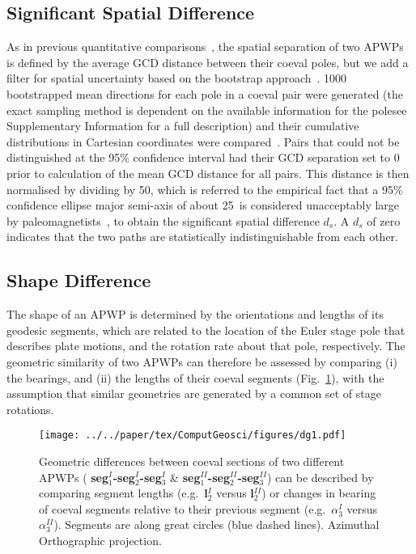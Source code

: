 \subsection{Significant Spatial Difference}\label{sec:sigDs}

As in previous quantitative comparisons~\citep[for example]{S07,T08}, the spatial
separation of two APWPs is defined by the average GCD distance between their
coeval poles, but we add a filter for spatial uncertainty based on the bootstrap
approach~\citep{T91}. 1000 bootstrapped mean directions for each pole in a
coeval pair were generated (the exact sampling method is dependent on the
available information for the pole\textemdash{}see Supplementary Information for
a full description) and their cumulative distributions in Cartesian coordinates
were compared~\citep{T91}. Pairs that could not be distinguished at the
95\% confidence interval had their GCD separation set to 0 prior to calculation
of the mean GCD distance for all pairs. This distance is then normalised by
dividing by 50\degree, which is referred to the empirical fact that a 95\%
confidence ellipse major semi-axis of about 25\degree\ is considered unacceptably
large by paleomagnetists~\citep{B92}, to obtain the significant spatial
difference $d_s$. A $d_s$ of zero indicates that the two paths are statistically
indistinguishable from each other.

\subsection{Shape Difference}

The shape of an APWP is determined by the orientations and lengths of its
geodesic segments, which are related to the location of the Euler stage pole
that describes plate motions, and the rotation rate about that pole,
respectively. The geometric similarity of two APWPs can therefore be assessed
by comparing (i) the bearings, and (ii) the lengths of their coeval segments
(Fig.~\ref{fig:direcdiff}), with the assumption that similar geometries are
generated by a common set of stage rotations.

\begin{figure}[tbp]
\texttt{[image: ../../paper/tex/ComputGeosci/figures/dg1.pdf]}
\caption[Geometric difference definition between two APWPs]{Geometric
differences between coeval sections of two different APWPs ({\bf
seg$_1^I$-seg$_2^I$-seg$_3^I$} \& {\bf seg$_1^{II}$-seg$_2^{II}$-seg$_3^{II}$})
can be described by comparing segment lengths (e.g.\ {\bf l$_2^I$} versus {\bf
l$_2^{II}$}) or changes in bearing of coeval segments relative to their
previous segment (e.g.\ {\bf $\alpha_3^I$} versus {\bf $\alpha_3^{II}$}). Segments
are along great circles (blue dashed lines). Azimuthal Orthographic
projection.}\label{fig:direcdiff}
\end{figure}

